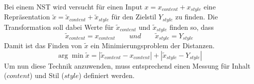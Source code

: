\noindent
\newline
Bei einem \gls{NST} wird versucht für einen Input $ x = x_{content} + x_{style} $ eine Repräsentation $
\widetilde{x} = \widetilde{x}_{content} + \widetilde{x}_{style} $ für den Zielstil $ Y_{style} $ zu finden. Die
Transformation soll dabei Werte für $ \widetilde{x}_{content} $ und $ \widetilde{x}_{style} $ finden so, dass
\begin{equation}
	\widetilde{x}_{content} = x_{content} \qquad und \qquad \widetilde{x}_{style} = Y_{style}
\end{equation}
\noindent
Damit ist das Finden von $ \widetilde{x} $ ein Minimierungsproblem der Distanzen.
\begin{equation}
	\arg\min \widetilde{x} = |\widetilde{x}_{content} - x_{content}| + |\widetilde{x}_{style} - Y_{style}|
\end{equation}
\noindent
\newline
Um nun diese Technik anzuwenden, muss entsprechend einen Messung für Inhalt ($ content $) und Stil ($ style $) definiert
werden.

